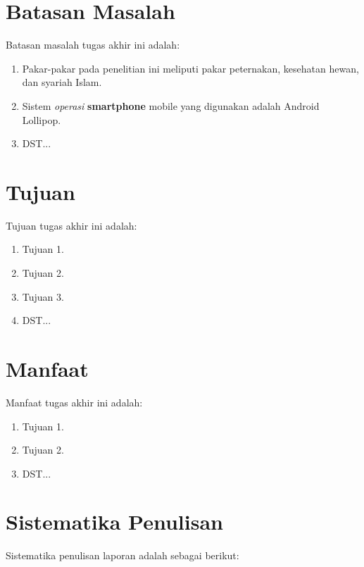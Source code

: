 \section{Batasan Masalah}
Batasan masalah tugas akhir ini adalah:
\begin{enumerate}
	\item Pakar-pakar pada penelitian ini meliputi pakar peternakan, kesehatan hewan, dan syariah Islam.
	\item Sistem \textit{operasi} \textbf{smartphone} mobile yang digunakan adalah Android Lollipop.
	\item DST...
\end{enumerate}

\section{Tujuan}
Tujuan tugas akhir ini adalah:
\begin{enumerate}
	\item Tujuan 1.
	\item Tujuan 2.
	\item Tujuan 3.
	\item DST...
\end{enumerate}

\section{Manfaat}
Manfaat tugas akhir ini adalah:
\begin{enumerate}
	\item Tujuan 1.
	\item Tujuan 2.
	\item DST...
\end{enumerate}

\section{Sistematika Penulisan}
Sistematika penulisan laporan adalah sebagai berikut:

